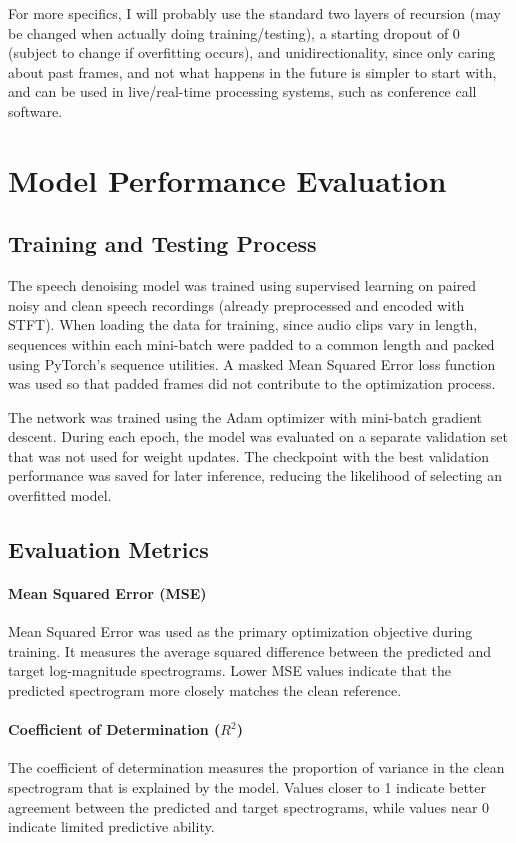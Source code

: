 \documentclass[11pt, letterpaper]{article}
\begin{document}
For more specifics, I will probably use the standard two layers of recursion (may be changed when actually doing training/testing), a starting dropout of 0 (subject to change if overfitting occurs), and unidirectionality, since only caring about past frames, and not what happens in the future is simpler to start with, and can be used in live/real-time processing systems, such as conference call software. 


\section{Model Performance Evaluation}

\subsection{Training and Testing Process}

The speech denoising model was trained using supervised learning on paired noisy and clean speech recordings (already preprocessed and encoded with STFT). When loading the data for training, since audio clips vary in length, sequences within each mini-batch were padded to a common length and packed using PyTorch's sequence utilities. A masked Mean Squared Error loss function was used so that padded frames did not contribute to the optimization process.

The network was trained using the Adam optimizer with mini-batch gradient descent. During each epoch, the model was evaluated on a separate validation set that was not used for weight updates. The checkpoint with the best validation performance was saved for later inference, reducing the likelihood of selecting an overfitted model.

\subsection{Evaluation Metrics}


\paragraph{Mean Squared Error (MSE)}
Mean Squared Error was used as the primary optimization objective during training. It measures the average squared difference between the predicted and target log-magnitude spectrograms. Lower MSE values indicate that the predicted spectrogram more closely matches the clean reference.

\paragraph{Coefficient of Determination ($R^2$)}
The coefficient of determination measures the proportion of variance in the clean spectrogram that is explained by the model. Values closer to 1 indicate better agreement between the predicted and target spectrograms, while values near 0 indicate limited predictive ability.
\end{document}
